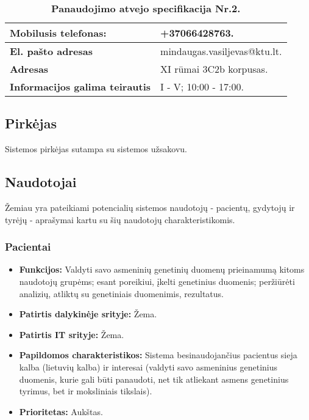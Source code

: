\documentclass[12pt]{article}
\begin{document}
\begin{table}[htb!]
    \captionsetup{justification=centering}
    \caption{\small\textbf{Panaudojimo atvejo specifikacija Nr.2.}}
    \begin{tabular}{|m{6cm}|m{11cm}|}
        \hline
        \raggedleft \textbf{\cellcolor{orange!30}Mobilusis telefonas:} &
        +37066428763. \\
        \hline
        \raggedleft \textbf{\cellcolor{orange!30}El. pašto adresas} &
        mindaugas.vasiljevas@ktu.lt. \\
        \hline
        \raggedleft \textbf{\cellcolor{orange!30}Adresas} & 
        XI rūmai 3C2b korpusas. \\
        \hline
        \raggedleft \textbf{\cellcolor{orange!30}Informacijos galima teirautis}
        & I - V; 10:00 - 17:00. \\
        \hline
    \end{tabular}
    \label{table:kontaktiniai_duomenys}
\end{table}

\subsection{Pirkėjas}
Sistemos pirkėjas sutampa su sistemos užsakovu.

\subsection{Naudotojai}
Žemiau yra pateikiami potencialių sistemos naudotojų - pacientų, gydytojų ir
tyrėjų - aprašymai kartu su šių naudotojų charakteristikomis.

\subsubsection*{Pacientai}
\begin{itemize}
    \item \textbf{Funkcijos:} Valdyti savo asmeninių genetinių duomenų
    prieinamumą kitoms naudotojų grupėms; esant poreikiui, įkelti genetinius
    duomenis; peržiūrėti analizių, atliktų su genetiniais duomenimis,
    rezultatus.
    \item \textbf{Patirtis dalykinėje srityje:} Žema.
    \item \textbf{Patirtis IT srityje:} Žema.
    \item \textbf{Papildomos charakteristikos:} Sistema besinaudojančius
    pacientus sieja kalba (lietuvių kalba) ir interesai (valdyti savo asmeninius
    genetinius duomenis, kurie gali būti panaudoti, net tik atliekant asmens
    genetinius tyrimus, bet ir moksliniais tikslais).
    \item \textbf{Prioritetas:} Aukštas.
\end{itemize}
\end{document}
